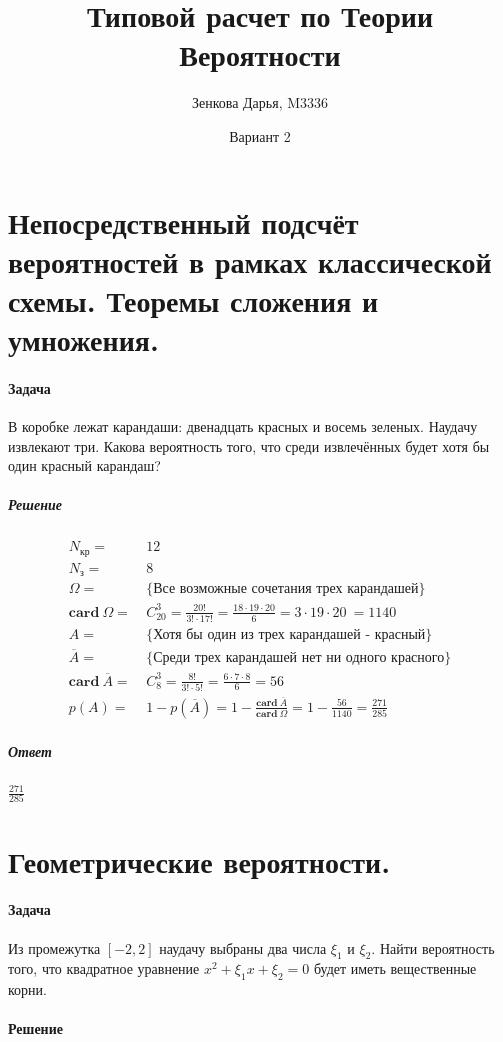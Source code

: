 \documentclass[fleqn]{article}
\title{Типовой расчет по Теории Вероятности}
\author{Зенкова Дарья, M3336}
\date{Вариант 2}
\begin{document}
\maketitle
\newpage
{}

\section{Непосредственный подсчёт вероятностей в рамках классической схемы. Теоремы сложения и умножения.}

\paragraph{Задача}
В коробке лежат карандаши: двенадцать красных и восемь зеленых. Наудачу извлекают три. Какова вероятность того, что среди извлечённых будет хотя бы один красный карандаш?
\subparagraph{Решение}
\begin{align*}
N_{\text{кр}} =&\ 12 \\ 
N_{\text{з}} =&\ 8 \\
\Omega =&\ \{\text{Все возможные сочетания трех карандашей}\} \\
\textbf{card}\ \Omega =&\ C^3_{20} = \frac{20!}{3!\cdot17!} = \frac{18\cdot19\cdot20}{6} = 3\cdot19\cdot20\ = 1140 \\
A =&\ \{\text{Хотя бы один из трех карандашей - красный}\} \\
\overline{A} =&\ \{\text{Среди трех карандашей нет ни одного красного}\} \\
\textbf{card}\ \overline{A} =&\ C^3_{8} = \frac{8!}{3!\cdot5!} = \frac{6\cdot7\cdot8}{6} = 56 \\
p(A) =&\ 1 - p(\overline{A}) = 1 - \frac{\textbf{card}\ \overline{A}}{\textbf{card}\ \Omega} = 1 - \frac{56}{1140} = \frac{271}{285}
\end{align*}
\subparagraph{Ответ} \(\frac{271}{285}\)
  
\section{Геометрические вероятности.}
\paragraph{Задача}
Из промежутка \({[{-2}, 2]}\) наудачу выбраны два числа \(\xi_1\) и \(\xi_2\). Найти вероятность того, что квадратное уравнение \(x^2+\xi_1x+\xi_2=0\) будет иметь вещественные корни.
\paragraph{Решение}
  
\end{document}
